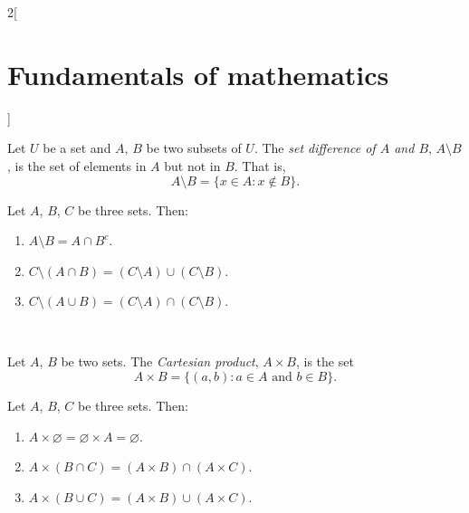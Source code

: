 \documentclass[../../../main.tex]{subfiles}
\begin{document}
\begin{multicols}{2}[\section{Fundamentals of mathematics}]
\begin{prop}
\begin{enumerate}
        \end{enumerate}
    \end{prop}
    \begin{definition}
        Let $U$ be a set and $A$, $B$ be two subsets of $U$. The \textit{set difference of $A$ and $B$}, $A\setminus B$, is the set of elements in $A$ but not in $B$. That is, $$A\setminus B=\{x\in A:x\notin B\}.$$
    \end{definition}
    \begin{prop}
        Let $A$, $B$, $C$ be three sets. Then:
        \begin{enumerate}
            \item $A\setminus B=A\cap B^c$.
            \item $C\setminus(A\cap B)=(C\setminus A)\cup (C\setminus B)$.
            \item $C\setminus(A\cup B)=(C\setminus A)\cap (C\setminus B)$.
        \end{enumerate}
    \end{prop}
    \begin{center}
        \hfill
        \\
        \vspace{0.02\linewidth}
        \hfill
        
    \end{center}
    \begin{definition}
        Let $A$, $B$ be two sets. The \textit{Cartesian product}, $A\times B$, is the set $$A\times B=\{(a,b): a\in A\text{ and }b\in B\}.$$
    \end{definition}
    \begin{prop}
        Let $A$, $B$, $C$ be three sets. Then:
        \begin{enumerate}
            \item $A\times \varnothing=\varnothing\times A=\varnothing$.
            \item $A\times(B\cap C)=(A\times B)\cap(A\times C)$.
            \item $A\times(B\cup C)=(A\times B)\cup(A\times C)$.
        \end{enumerate}
    \end{prop}

\end{multicols}
\end{document}
